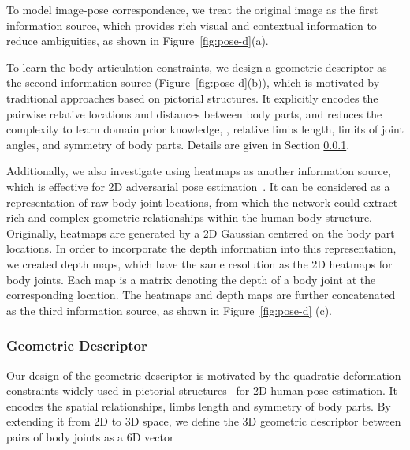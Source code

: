 \documentclass[10pt,twocolumn,letterpaper]{article}
\begin{document}
To model image-pose correspondence, we treat the original image as the first information source, which provides rich visual and contextual information to reduce ambiguities, as shown in Figure~\ref{fig:pose-d}(a).


To learn the body articulation constraints, we design a geometric descriptor as the second information source (Figure~\ref{fig:pose-d}(b)), which is motivated by traditional approaches based on pictorial structures. 
It explicitly encodes the pairwise relative locations and distances between body parts, and reduces the complexity to learn domain prior knowledge, \eg, relative limbs length, limits of joint angles,  and symmetry of body parts. 
Details are given in Section \ref{sec:geo-feats}. 


Additionally, we also investigate using heatmaps as another information source, which is effective for 2D adversarial pose estimation~\cite{chen2017adversarial}. 
It can be considered as a representation of raw body joint locations, from which the network could extract rich and complex geometric relationships within the human body structure. 
Originally, heatmaps are generated by a 2D Gaussian centered on the body part locations. 
In order to incorporate the depth information into this representation, we created  depth maps, which have the same resolution as the 2D heatmaps for body joints. 
Each map is a matrix denoting the depth of a body joint at the corresponding location.   
The heatmaps and depth maps are further concatenated as the third information source, as shown in Figure~\ref{fig:pose-d} (c). 















\subsubsection{Geometric Descriptor}\label{sec:geo-feats} 
Our design of the geometric descriptor is motivated by the quadratic deformation constraints widely used in pictorial structures~\cite{yang2011articulated,pishchulin2013poselet,chen2014articulated} for 2D human pose estimation. 
It encodes the spatial relationships, limbs length and symmetry of body parts.  
By extending it from 2D to 3D space, we define the 3D geometric descriptor  between pairs of body joints as a 6D vector 
\end{document}
